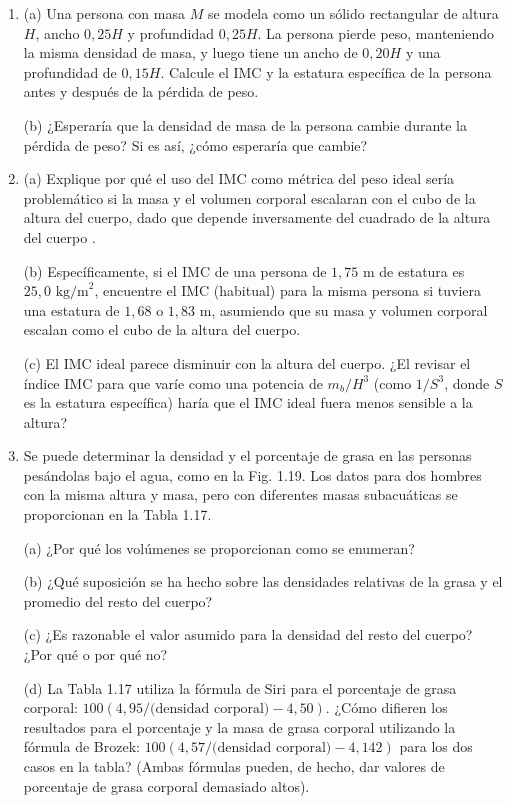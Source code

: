 \documentclass[12pt]{book}
\begin{document}
\begin{enumerate}
\item[1.41] (a) Una persona con masa $M$ se modela como un sólido rectangular de altura $H$, ancho $0,25 H$ y profundidad $0,25 H$. La persona pierde peso, manteniendo la misma densidad de masa, y luego tiene un ancho de $0,20 H$ y una profundidad de $0,15 H$. Calcule el IMC y la estatura específica de la persona antes y después de la pérdida de peso.
  
  (b) ¿Esperaría que la densidad de masa de la persona cambie durante la pérdida de peso? Si es así, ¿cómo esperaría que cambie?

\item[1.42] (a) Explique por qué el uso del IMC como métrica del peso ideal sería problemático si la masa y el volumen corporal escalaran con el cubo de la altura del cuerpo, dado que depende inversamente del cuadrado de la altura del cuerpo \cite{13, 19}.
  
  (b) Específicamente, si el IMC de una persona de $1,75\text{ m}$ de estatura es $25,0\text{ kg/m}^2$, encuentre el IMC (habitual) para la misma persona si tuviera una estatura de $1,68$ o $1,83\text{ m}$, asumiendo que su masa y volumen corporal escalan como el cubo de la altura del cuerpo.
  
  (c) El IMC ideal parece disminuir con la altura del cuerpo. ¿El revisar el índice IMC para que varíe como una potencia de $m_b/H^3$ (como $1/S^3$, donde $S$ es la estatura específica) haría que el IMC ideal fuera menos sensible a la altura?

\item[1.43] Se puede determinar la densidad y el porcentaje de grasa en las personas pesándolas bajo el agua, como en la Fig. 1.19. Los datos para dos hombres con la misma altura y masa, pero con diferentes masas subacuáticas se proporcionan en la Tabla 1.17.
  
  (a) ¿Por qué los volúmenes se proporcionan como se enumeran?
  
  (b) ¿Qué suposición se ha hecho sobre las densidades relativas de la grasa y el promedio del resto del cuerpo?
  
  (c) ¿Es razonable el valor asumido para la densidad del resto del cuerpo? ¿Por qué o por qué no?
  
  (d) La Tabla 1.17 utiliza la fórmula de Siri para el porcentaje de grasa corporal: $100 (4,95/\text{(densidad corporal)} - 4,50)$. ¿Cómo difieren los resultados para el porcentaje y la masa de grasa corporal utilizando la fórmula de Brozek: $100 (4,57/\text{(densidad corporal)} - 4,142)$ para los dos casos en la tabla? (Ambas fórmulas pueden, de hecho, dar valores de porcentaje de grasa corporal demasiado altos).


\end{enumerate}
\end{document}
